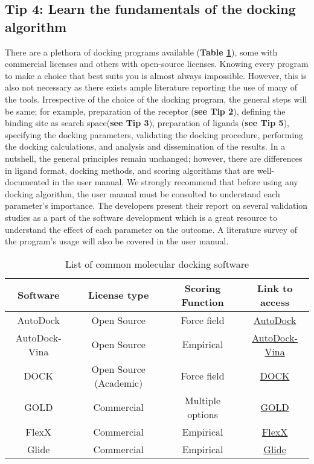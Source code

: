 \documentclass[10pt,letterpaper]{article}
\begin{document}
{{\subsection*{Tip 4: Learn the fundamentals of the docking algorithm}
There are a plethora of docking programs available (\textbf{Table \ref{tab:List}}), some with commercial licenses and others with open-source licenses. Knowing every program to make a choice that best suits you is almost always impossible. However, this is also not necessary as there exists ample literature reporting the use of many of the tools. Irrespective of the choice of the docking program, the general steps will be same; for example, preparation of the receptor (\textbf{see  Tip 2}), defining the binding site as search space(\textbf{see Tip 3}), preparation of ligands (\textbf{see Tip 5}), specifying the docking parameters, validating the docking procedure, performing the docking calculations, and analysis and dissemination of the results.  In a nutshell, the general principles remain unchanged; however, there are differences in ligand format, docking methods, and scoring algorithms that are well-documented in the user manual. We strongly recommend that before using any docking algorithm, the user manual must be consulted to understand each parameter's importance. The developers present their report on several validation studies as a part of the software development which is a great resource to understand the effect of each parameter on the outcome. A literature survey of the program's usage will also be covered in the user manual. 

\begin{table}[ht]
    \centering
    \caption{List of common molecular docking software}
    \label{tab:List}
    \begin{tabular}{|c|c|c|c|}
    \hline
         \textbf{Software} & \textbf{License type} & \textbf{Scoring Function} & \textbf{Link to access} \\
    \hline
        AutoDock & Open Source & Force field & \href{https://autodock.scripps.edu/download-autodock4/}{AutoDock}  \\
        AutoDock-Vina & Open Source & Empirical & \href{https://github.com/ccsb-scripps/AutoDock-Vina/releases}{AutoDock-Vina}  \\
        DOCK & Open Source (Academic) & Force field  & \href{https://dock.compbio.ucsf.edu}{DOCK}  \\
        GOLD &  Commercial & Multiple options & \href{https://www.ccdc.cam.ac.uk/solutions/software/gold/}{GOLD} \\
        FlexX &  Commercial & Empirical   & \href{https://www.biosolveit.de/products/#FlexX}{FlexX}  \\
        Glide &  Commercial & Empirical  & \href{https://www.schrodinger.com/platform/products/glide/}{Glide} \\
    \hline
    \end{tabular}
\end{table}

}}
\end{document}
